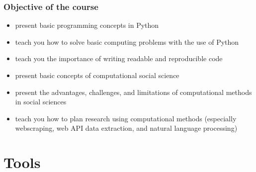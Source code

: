 \documentclass{beamer}
\begin{document}
\begin{frame}
    \frametitle{Objective of the course}
    \begin{itemize}
        \item<1> present basic programming concepts in Python
        \item<1> teach you how to solve basic computing problems with the use of Python
        \item<1> teach you the importance of writing readable and reproducible code
        \item<1> present basic concepts of computational social science
        \item<1> present the advantages, challenges, and limitations of computational methods in social sciences
        \item<1> teach you how to plan research using computational methods (especially webscraping, web API data extraction, and natural language processing)
        
    \end{itemize}
\end{frame}

\section{Tools}
\end{document}
